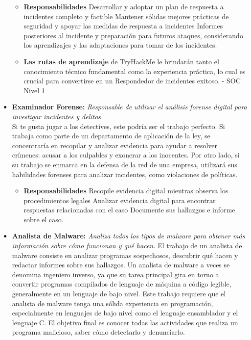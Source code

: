 \begin{itemize}
\begin{itemize}\item \textbf{Responsabilidades}
Desarrollar y adoptar un plan de respuesta a incidentes completo y factible
Mantener sólidas mejores prácticas de seguridad y apoyar las medidas de respuesta a incidentes
Informes posteriores al incidente y preparación para futuros ataques, considerando los aprendizajes y las adaptaciones para tomar de los incidentes.\\
\item \textbf{Las rutas de aprendizaje} de TryHackMe le brindarán tanto el conocimiento técnico fundamental como la experiencia práctica, lo cual es crucial para convertirse en un Respondedor de incidentes exitoso. - 
SOC Nivel 1

\end{itemize}
\item \textbf{Examinador Forense:} \textit{Responsable de utilizar el análisis forense digital para investigar incidentes y delitos.}\\
Si te gusta jugar a los detectives, este podría ser el trabajo perfecto. Si trabaja como parte de un departamento de aplicación de la ley, se concentraría en recopilar y analizar evidencia para ayudar a resolver crímenes: acusar a los culpables y exonerar a los inocentes. Por otro lado, si su trabajo se enmarca en la defensa de la red de una empresa, utilizará sus habilidades forenses para analizar incidentes, como violaciones de políticas.
%

\begin{itemize}\item \textbf{Responsabilidades}
Recopile evidencia digital mientras observa los procedimientos legales
Analizar evidencia digital para encontrar respuestas relacionadas con el caso
Documente sus hallazgos e informe sobre el caso.

\end{itemize}
\item \textbf{Analista de Malware:} \textit{Analiza todos los tipos de malware para obtener más información sobre cómo funcionan y qué hacen.} El trabajo de un analista de malware consiste en analizar programas sospechosos, descubrir qué hacen y redactar informes sobre sus hallazgos. Un analista de malware a veces se denomina ingeniero inverso, ya que su tarea principal gira en torno a convertir programas compilados de lenguaje de máquina a código legible, generalmente en un lenguaje de bajo nivel. Este trabajo requiere que el analista de malware tenga una sólida experiencia en programación, especialmente en lenguajes de bajo nivel como el lenguaje ensamblador y el lenguaje C. El objetivo final es conocer todas las actividades que realiza un programa malicioso, saber cómo detectarlo y denunciarlo.\\
%


\end{itemize}
